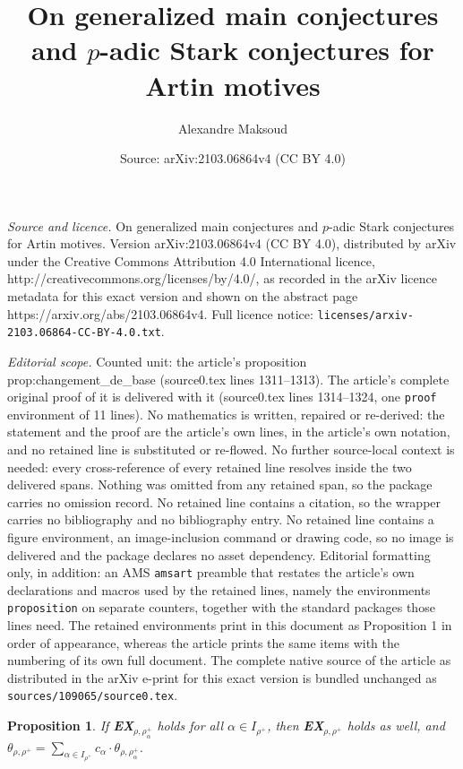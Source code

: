 \documentclass[10pt,a4paper]{amsart}
\title{On generalized main conjectures and $p$-adic Stark conjectures for Artin motives}
\author{Alexandre Maksoud}
\date{Source: arXiv:2103.06864v4 (CC BY 4.0)}
\newtheorem{proposition}{Proposition}
\begin{document}
\maketitle

\noindent\emph{Source and licence.} On generalized main conjectures and $p$-adic Stark conjectures for Artin motives. Version arXiv:2103.06864v4 (CC BY 4.0), distributed by arXiv under the Creative Commons Attribution 4.0 International licence, http://creativecommons.org/licenses/by/4.0/, as recorded in the arXiv licence metadata for this exact version and shown on the abstract page https://arxiv.org/abs/2103.06864v4. Full licence notice: \texttt{licenses/arxiv-2103.06864-CC-BY-4.0.txt}.\par\smallskip

\noindent\textit{Editorial scope.} Counted unit: the article's proposition prop:changement\_de\_base (source0.tex lines 1311--1313). The article's complete original proof of it is delivered with it (source0.tex lines 1314--1324, one \texttt{proof} environment of 11 lines). No mathematics is written, repaired or re-derived: the statement and the proof are the article's own lines, in the article's own notation, and no retained line is substituted or re-flowed.  No further source-local context is needed: every cross-reference of every retained line resolves inside the two delivered spans.  Nothing was omitted from any retained span, so the package carries no omission record.  No retained line contains a citation, so the wrapper carries no bibliography and no bibliography entry.  No retained line contains a figure environment, an image-inclusion command or drawing code, so no image is delivered and the package declares no asset dependency.  Editorial formatting only, in addition: an AMS \texttt{amsart} preamble that restates the article's own declarations and macros used by the retained lines, namely the environments \texttt{proposition} on separate counters, together with the standard packages those lines need.  The retained environments print in this document as Proposition 1 in order of appearance, whereas the article prints the same items with the numbering of its own full document.  The complete native source of the article as distributed in the arXiv e-print for this exact version is bundled unchanged as \texttt{sources/109065/source0.tex}.
\begin{proposition}\label{prop:changement_de_base}
	If \textbf{EX}$_{\rho,\rho^+_\alpha}$ holds for all $\alpha\in I_{\rho^+}$, then \textbf{EX}$_{\rho,\rho^+}$ holds as well, and $\theta_{\rho,\rho^+} = \sum_{\alpha \in I_{\rho^+}}c_\alpha\cdot \theta_{\rho,\rho^+_\alpha}$.
\end{proposition}
\end{document}
